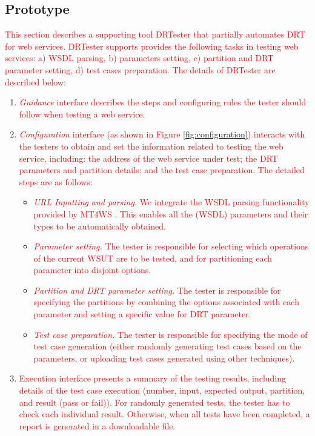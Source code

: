 \documentclass[10pt,journal,compsoc]{IEEEtran}
\begin{document}
\subsection{Prototype}
\label{sec:prototype}

\textcolor{red}{This section describes a supporting tool DRTester that partially automates DRT for web services. DRTester supports provides the following tasks in testing web services: a) WSDL parsing, b) parameters setting, c) partition and DRT parameter setting, d) test cases preparation. The details of DRTester are described below:}

\begin{enumerate}[1)]
  \item
  \textcolor{red}{\emph{Guidance} interface describes the steps and configuring rules the tester should follow when testing a web service.}

  \item
  \textcolor{red}{\emph{Configuration} interface (as shown in Figure \ref{fig:configuration}) interacts with the testers to obtain and set the information related to testing the web service, including: the address of the web service under test; the DRT parameters and partition details; and the test case preparation. The detailed steps are as follows:}

  \begin{itemize}
    \item
    \textcolor{red}{\emph{URL Inputting and parsing.} We integrate the WSDL parsing functionality provided by MT4WS \cite{sun2016mt4ws}. This enables all the (WSDL) parameters and their types to be automatically obtained.}
    \item
    \textcolor{red}{\emph{Parameter setting.} The tester is responsible for selecting which operations of the current WSUT are to be tested, and for partitioning each parameter into disjoint options.}
    \item
    \textcolor{red}{\emph{Partition and DRT parameter setting.} The tester is responsible for specifying the partitions by combining the options associated with each parameter and setting a specific value for DRT parameter.}
    \item
    \textcolor{red}{\emph{Test case preparation.} The tester is responsible for specifying the mode of test case generation (either randomly generating test cases based on the parameters, or uploading test cases generated using other techniques).}
  \end{itemize}
  \item
  \textcolor{red}{Execution interface presents a summary of the testing results, including details of the test case execution (number, input, expected output, partition, and result (pass or fail)). For randomly generated tests, the tester has to check each individual result. Otherwise, when all tests have been completed, a report is generated in a downloadable file.}
\end{enumerate}
\end{document}

